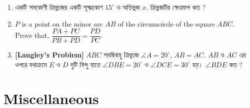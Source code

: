 \documentclass[11pt, a4paper]{article}
\begin{document}
\begin{enumerate}
	\item \textbengali{একটি সমকোণী ত্রিভুজের একটি সূক্ষ্মকোণ} $15^{\circ}$ \textbengali{ও অতিভুজ} $x$. \textbengali{ত্রিভুজটির ক্ষেত্রফল কত ?}
	
	\item $P$ is a point on the minor arc $AB$ of the circumcircle of the square $ABC$. Prove that, $\dfrac{PA + PC}{PB+PD} = \dfrac{PD}{PC}$.
	
	\item \textbf{[Langley's Problem]} $ABC$ \textbengali{সমদ্বিবাহু ত্রিভুজে} $\angle A = 20^{\circ}$, $AB = AC$. $AB$ \textbengali{ও} $AC$ \textbengali{এর ওপরে যথাক্রমে} $E$ \textbengali{ও} $D$ \textbengali{দুটি বিন্দু যাতে} $\angle DBE = 20^{\circ}$ \textbengali{ও} $\angle DCE = 30^{\circ}$ \textbengali{হয়।} $\angle BDE$ \textbengali{কত ?}
\end{enumerate}
		     
		  
		  
		  
		  
		  
		  
		  
		  
		  
		  
		  
		  
		  
		  
		  
		  
		  
		  
		  
		  
		  
		  
		  
		  
		  
		  
		     

\section{Miscellaneous}
\end{document}
